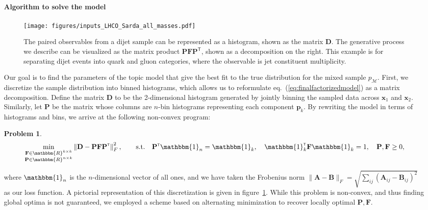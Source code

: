 \documentclass[a4paper,11pt]{article}
\renewcommand\intercal{\mathsf{\scriptscriptstyle T}}
\newcommand{\bbm}[1]{\mathbf{#1}}
\newcommand{\bv}[1]{\bbm{#1}}
\newtheorem{theo}{Problem}[section]
\newenvironment{ftheo}
  {\begin{mdframed}\begin{theo}}
  {\end{theo}\end{mdframed}}
\DeclareRobustCommand{\Eq}[1]{eq.~(\ref{#1})}
\DeclareRobustCommand{\Fig}[1]{figure~\ref{#1}}
\begin{document}
\paragraph{Algorithm to solve the model}
\label{subsec:algorithms}

\begin{figure}[t]
\centering
\texttt{[image: figures/inputs\_LHCO\_Sarda\_all\_masses.pdf]}
\caption{
The paired observables from a dijet sample can be represented as a histogram, shown as the matrix $\bbm{D}$.
The generative process we describe can be visualized as the matrix product $\bbm{PFP}^\intercal$, shown as a decomposition on the right.
This example is for separating dijet events into quark and gluon categories, where the observable is jet constituent multiplicity.
}
\label{fig:matmuls}
\end{figure}

Our goal is to find the parameters of the topic model that give the best fit to the true distribution for the mixed sample $p_\mathcal{M}$.
First, we discretize the sample distribution into binned histograms, which allows us to reformulate \Eq{eq:finalfactorizedmodel} as a matrix decomposition.
Define the matrix $\bbm{D}$ to be the 2-dimensional histogram generated by jointly binning the sampled data across $\bv{x}_1$ and $\bv{x}_2$.
Similarly, let $\bbm{P}$ be the matrix whose columns are $n$-bin histograms representing each component $\bbm{p}_k$.
By rewriting the model in terms of histograms and bins, we arrive at the following non-convex program:
\begin{ftheo}
\begin{equation*}
\label{prob:disc_min}
\begin{aligned}
\min_{\substack{\bbm{F} \in \mathbbm{R}^{k \times k} \\ \bbm{P} \in \mathbbm{R}^{n \times k}}} \left\|\bbm{D} - \bbm{PFP}^\intercal\right\|^2_F, \qquad 
\text{s.t.} \quad \bbm{P}^\intercal \mathbbm{1}_n = \mathbbm{1}_k, \quad \mathbbm{1}_k^\intercal \bbm{F} \mathbbm{1}_k = 1, \quad \bbm{P,F} \geq 0,\\
\end{aligned}
\end{equation*}
\end{ftheo}
where $\mathbbm{1}_n$ is the $n$-dimensional vector of all ones, and we have taken the Frobenius norm $\|\bbm{A} - \bbm{B}\|_F = \sqrt{\sum_{ij} (\bbm{A}_{ij} - \bbm{B}_{ij})^2}$ as our loss function.
A pictorial representation of this discretization is given in \Fig{fig:matmuls}. 
While this problem is non-convex, and thus finding global optima is not guaranteed, we employed a scheme based on alternating minimization to recover locally optimal $\bbm{P}, \bbm{F}$.
\end{document}
